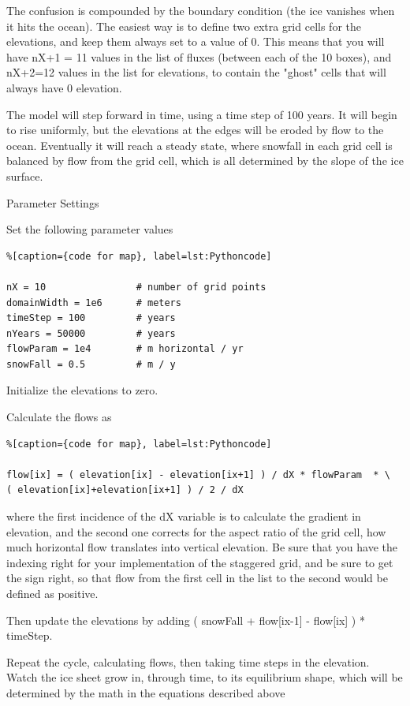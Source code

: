 {The confusion is compounded by the boundary condition (the ice vanishes when it hits the ocean). The easiest way is to define two extra grid cells for the elevations, and keep them always set to a value of 0. This means that you will have nX+1 = 11 values in the list of fluxes (between each of the 10 boxes), and nX+2=12 values in the list for elevations, to contain the "ghost" cells that will always have 0 elevation.

The model will step forward in time, using a time step of 100 years. It will begin to rise uniformly, but the elevations at the edges will be eroded by flow to the ocean. Eventually it will reach a steady state, where snowfall in each grid cell is balanced by flow from the grid cell, which is all determined by the slope of the ice surface.

Parameter Settings

Set the following parameter values

\begin{lstlisting}%[caption={code for map}, label=lst:Pythoncode]

nX = 10                # number of grid points
domainWidth = 1e6      # meters
timeStep = 100         # years
nYears = 50000         # years
flowParam = 1e4        # m horizontal / yr
snowFall = 0.5         # m / y
\end{lstlisting}

Initialize the elevations to zero.

Calculate the flows as

\begin{lstlisting}%[caption={code for map}, label=lst:Pythoncode]

flow[ix] = ( elevation[ix] - elevation[ix+1] ) / dX * flowParam  * \
( elevation[ix]+elevation[ix+1] ) / 2 / dX
\end{lstlisting}

where the first incidence of the dX variable is to calculate the gradient in elevation, and the second one corrects for the aspect ratio of the grid cell, how much horizontal flow translates into vertical elevation. Be sure that you have the indexing right for your implementation of the staggered grid, and be sure to get the sign right, so that flow from the first cell in the list to the second would be defined as positive.

Then update the elevations by adding ( snowFall + flow[ix-1] - flow[ix] ) * timeStep.

Repeat the cycle, calculating flows, then taking time steps in the elevation. Watch the ice sheet grow in, through time, to its equilibrium shape, which will be determined by the math in the equations described above

}
